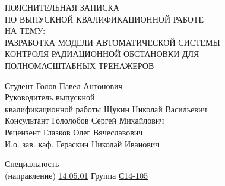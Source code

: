 \begin{center}
	\large
	\hfill \break \hfill \break \hfill \break \hfill \break
	ПОЯСНИТЕЛЬНАЯ ЗАПИСКА\\ ПО ВЫПУСКНОЙ КВАЛИФИКАЦИОННОЙ РАБОТЕ\\ НА ТЕМУ:\\[1.5cm]

	\normalsize
	РАЗРАБОТКА МОДЕЛИ АВТОМАТИЧЕСКОЙ СИСТЕМЫ \\ КОНТРОЛЯ РАДИАЦИОННОЙ ОБСТАНОВКИ ДЛЯ \\ПОЛНОМАСШТАБНЫХ ТРЕНАЖЕРОВ\\[6.0cm]
\end{center}

\noindent
\small
Студент \hspace{4.2cm} \underline{\hspace{4.2cm}} \hspace{0.7cm} Голов Павел Антонович\\

\noindent
Руководитель выпускной\\ квалификационной работы \hspace{0.85cm} \underline{\hspace{4.2cm}} \hspace{0.7cm} Щукин Николай Васильевич\\

\noindent
Консультант \hspace{3.35cm} \underline{\hspace{4.2cm}} \hspace{0.7cm} Гололобов Сергей Михайлович\\

\noindent
Рецензент \hspace{3.85cm} \underline{\hspace{4.2cm}} \hspace{0.7cm} Глазков Олег Вячеславович\\

\noindent
И.о. зав. каф. \hspace{3.25cm} \underline{\hspace{4.2cm}} \hspace{0.7cm} Гераскин Николай Иванович\\[0.6cm]

\clearpage

\normalsize
\noindent
Специальность\\ (направление) \underline{14.05.01} \hspace{4.0cm} Группа \underline{С14-105}

